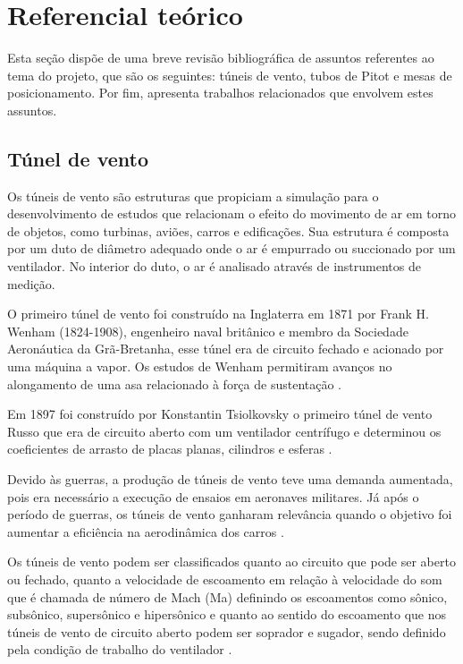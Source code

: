 \chapter{Referencial teórico}\label{ch:referencial}

Esta seção dispõe de uma breve revisão bibliográfica de assuntos referentes ao tema do projeto, que são 
os seguintes: túneis de vento, tubos de Pitot e mesas de posicionamento. Por fim, apresenta trabalhos 
relacionados que envolvem estes assuntos.

\section{Túnel de vento}\label{sec:tunel}

Os túneis de vento são estruturas que propiciam a simulação para o desenvolvimento de estudos que relacionam 
o efeito do movimento de ar em torno de objetos, como turbinas, aviões, carros e edificações. Sua estrutura 
é composta por um duto de diâmetro adequado onde o ar é empurrado ou succionado por um ventilador. No 
interior do duto, o ar é analisado através de instrumentos de medição.

O primeiro túnel de vento foi construído na Inglaterra em 1871 por Frank H. Wenham (1824-1908), engenheiro 
naval britânico e membro da Sociedade Aeronáutica da Grã-Bretanha, esse túnel era de circuito fechado e 
acionado por uma máquina a vapor. Os estudos de Wenham permitiram avanços no alongamento de uma asa 
relacionado à força de sustentação \cite{carminatti2019desenvolvimento}.

Em 1897 foi construído por Konstantin Tsiolkovsky o primeiro túnel de vento Russo que era de circuito 
aberto com um ventilador centrífugo e determinou os coeficientes de arrasto de placas planas, cilindros 
e esferas \cite{joglekar2014design}. 

Devido às guerras, a produção de túneis de vento teve uma demanda aumentada, pois era necessário a execução 
de ensaios em aeronaves militares. Já após o período de guerras, os túneis de vento ganharam relevância 
quando o objetivo foi aumentar a eficiência na aerodinâmica dos carros \cite{de2014adalberto}. 

Os túneis de vento podem ser classificados  quanto ao circuito que pode ser aberto ou fechado,  quanto a velocidade 
de escoamento em relação à velocidade do som que é chamada de  número de Mach (Ma) definindo os escoamentos como sônico, 
subsônico, supersônico e hipersônico e quanto ao sentido do escoamento que nos túneis de vento de circuito aberto podem 
ser soprador e sugador, sendo definido pela condição de trabalho do  ventilador \cite{pritchard2005fox}.

